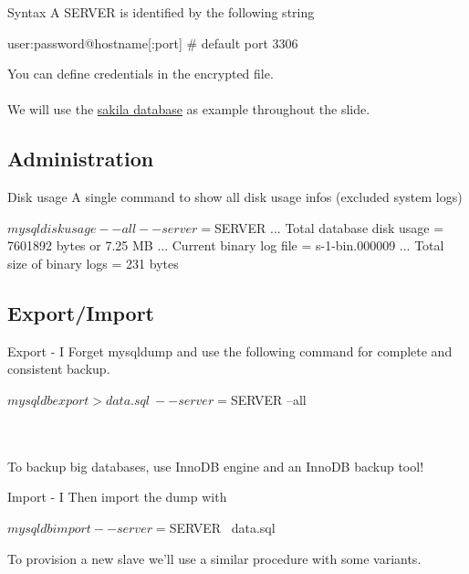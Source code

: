 \documentclass{beamer}[10]
\begin{document}
\begin{pyframe}{Syntax}
A SERVER is identified by the following string
\begin{bashcode}
user:password@hostname[:port] # default port 3306
\end{bashcode}
You can define credentials in the 
encrypted file.\\ \\
We will use the \href{http://dev.mysql.com/doc/index-other.html}
{sakila database} as example throughout
the slide.

\end{pyframe}

\subsection{Administration}
\begin{pyframe}{Disk usage}
A single command to show all disk usage infos (excluded system logs)

\begin{bashcode}
$ mysqldiskusage --all --server=$SERVER %
...
Total database disk usage = 7601892 bytes or 7.25 MB
...
Current binary log file = s-1-bin.000009
...
Total size of binary logs = 231 bytes
\end{bashcode}
\end{pyframe}

%
%
\subsection{Export/Import}

\begin{pyframe}{Export - I}
Forget mysqldump and use the following
command for complete and consistent backup.
\begin{bashcode}
$ mysqldbexport > data.sql \
    --server=$SERVER
    --all
\end{bashcode}
\\ \\
{
\large
To backup big databases, use InnoDB engine and an InnoDB backup tool!
}
\end{pyframe}


\begin{pyframe}{Import - I}
Then import the dump with
\begin{bashcode}
$ mysqldbimport --server=$SERVER \
    data.sql
\end{bashcode}
To provision a new slave we'll use a similar
procedure with some variants.
\end{pyframe}
\end{document}
